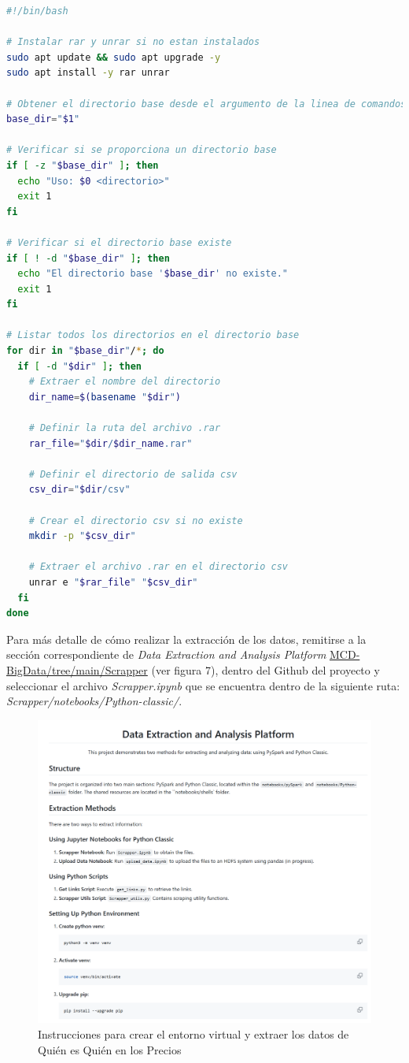 \documentclass{article}
\begin{document}
\begin{lstlisting}[language=bash,caption={bash version}]
#!/bin/bash

# Instalar rar y unrar si no estan instalados
sudo apt update && sudo apt upgrade -y
sudo apt install -y rar unrar

# Obtener el directorio base desde el argumento de la linea de comandos
base_dir="$1"

# Verificar si se proporciona un directorio base
if [ -z "$base_dir" ]; then
  echo "Uso: $0 <directorio>"
  exit 1
fi

# Verificar si el directorio base existe
if [ ! -d "$base_dir" ]; then
  echo "El directorio base '$base_dir' no existe."
  exit 1
fi

# Listar todos los directorios en el directorio base
for dir in "$base_dir"/*; do
  if [ -d "$dir" ]; then
    # Extraer el nombre del directorio
    dir_name=$(basename "$dir")
    
    # Definir la ruta del archivo .rar
    rar_file="$dir/$dir_name.rar"
    
    # Definir el directorio de salida csv
    csv_dir="$dir/csv"
    
    # Crear el directorio csv si no existe
    mkdir -p "$csv_dir"
    
    # Extraer el archivo .rar en el directorio csv
    unrar e "$rar_file" "$csv_dir"
  fi
done
\end{lstlisting}

Para más detalle de cómo realizar la extracción de los datos, remitirse a la sección correspondiente de \textit{Data Extraction and Analysis Platform} \href{https://github.com/Anonymate054/MCD-BigData/tree/main/Scrapper}{MCD-BigData/tree/main/Scrapper} (ver figura 7), dentro del Github del proyecto y seleccionar el archivo \textit{Scrapper.ipynb} que se encuentra dentro de la siguiente ruta: \textit{Scrapper/notebooks/Python-classic/}.


\begin{figure}[h]
\centering
\includegraphics[width=0.6\linewidth]{Reports/images/Extraction.png}
\caption{\label{fig:Extracción}Instrucciones para crear el entorno virtual y extraer los datos de Quién es Quién en los Precios}
\end{figure}
\end{document}
